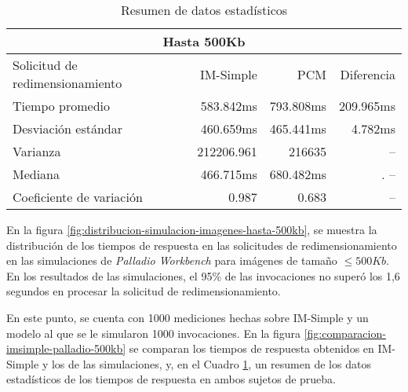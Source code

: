 \begin{table}
    \centering
    \begin{tabular}{l|r|r|r}
        \toprule[1.5pt]
        \multicolumn{4}{c}{\textbf{Hasta 500Kb}} \\
        \midrule
        Solicitud de redimensionamiento  & IM-Simple & PCM & Diferencia\\
        \midrule
        Tiempo promedio  & 583.842ms & 793.808ms & 209.965ms\\
        Desviación estándar & 460.659ms & 465.441ms & 4.782ms\\
        Varianza & 212206.961 & 216635 & -- \\
        Mediana & 466.715ms & 680.482ms &. -- \\
        Coeficiente de variación & 0.987 & 0.683 & -- \\                       
        \bottomrule[1.5pt]
    \end{tabular}
    \caption{Resumen de datos estadísticos}
    \label{table:datos-estadisticos-hasta-500kb}
\end{table}

En la figura \ref{fig:distribucion-simulacion-imagenes-hasta-500kb}, se muestra la distribución de los tiempos de respuesta en las solicitudes de redimensionamiento en las simulaciones de \emph{Palladio Workbench} para imágenes de tamaño $\leq 500Kb$. En los resultados de las simulaciones, el 95\% de las invocaciones no superó los 1,6 segundos en procesar la solicitud de redimensionamiento.

En este punto, se cuenta con 1000 mediciones hechas sobre IM-Simple y un modelo al que se le simularon 1000 invocaciones. En la figura \ref{fig:comparacion-imsimple-palladio-500kb} se comparan los tiempos de respuesta obtenidos en IM-Simple y los de las simulaciones, y, en el Cuadro \ref{table:datos-estadisticos-hasta-500kb}, un resumen de los datos estadísticos de los tiempos de respuesta en ambos sujetos de prueba.

